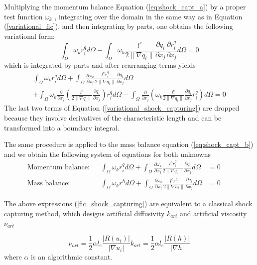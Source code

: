 \documentclass[a4paper,12pt]{article}
\newcommand{\pder}[2]{\frac{\partial#1}{\partial#2}}
\newcommand{\abs}[1]{\lvert#1\rvert}
\newcommand{\norm}[1]{\lVert#1\rVert}
\begin{document}
Multiplying the momentum balance Equation (\ref{eq:shock_capt_a}) by a proper test function $\omega_k$ , integrating over the domain in the same way as in Equation (\ref{variational_fic}), and then integrating by parts, one obtains the following variational form:
\begin{equation}
    \int_\Omega \omega_k r_i^q d\Omega
     - \int_\Omega \omega_k \frac{l^e}{2\norm{\nabla q_i}}\pder{q_i}{x_j}\pder{r_i^q}{x_j}
     d\Omega = 0
\end{equation}
which is integrated by parts and after rearranging terms yields
\begin{multline}
    \int_\Omega \omega_k r_i^q d\Omega 
    + \int_\Omega \pder{\omega_k}{x_j}
        \frac{l^e r_i^q}{2\norm{\nabla q_i}}\pder{q_i}{x_j} d\Omega \\
    + \int_\Omega \omega_k \pder{}{x_j}\left(
         \frac{l^e}{2\norm{\nabla q_i}}\pder{q_i}{x_j}
        \right)r_i^q d\Omega 
    - \int_\Omega \pder{}{x_j}\left(
        \omega_k \frac{l^e}{2\norm{\nabla q_i}}\pder{q_i}{x_j}r_i^q \right) d\Omega
        = 0
        \label{variational_shock_capturing}
\end{multline}
The last two terms of Equation (\ref{variational_shock_capturing}) are dropped because they involve derivatives of the characteristic length and can be transformed into a boundary integral.

The same procedure is applied to the mass balance equation (\ref{eq:shock_capt_b}) and we obtain the following system of equations for both unknowns
\begin{subequations} \label{fic_shock_capturing}
\begin{align}
\text{Momentum balance:} &&
\int_\Omega \omega_k r_i^q d\Omega 
+ \int_\Omega \pder{\omega_k}{x_j}
\frac{l^e r_i^q}{2\norm{\nabla q_i}}\pder{q_i}{x_j} d\Omega &=0 && \\
\text{Mass balance:} &&
\int_\Omega \omega_k r^h d\Omega 
+ \int_\Omega \pder{\omega_k}{x_j}
    \frac{l^e r^h}{2\norm{\nabla h_i}}\pder{q_i}{x_j} d\Omega &=0
\end{align}
\end{subequations}

The above expressions (\ref{fic_shock_capturing}) are equivalent to a classical shock capturing method, which designs artificial diffusivity $k_{art}$ and artificial viscosity $\nu_{art}$

\begin{subequations} \label{k_art}
\begin{equation}
\nu_{art} = \frac{1}{2}\alpha l_e \frac{\abs{R(u_i)}}{\abs{\nabla u_i}}
\end{equation}
\begin{equation}
k_{art} = \frac{1}{2}\alpha l_e \frac{\abs{R(h)}}{\abs{\nabla h}}
\end{equation}
\end{subequations}
where $\alpha$ is an algorithmic constant.
\end{document}
